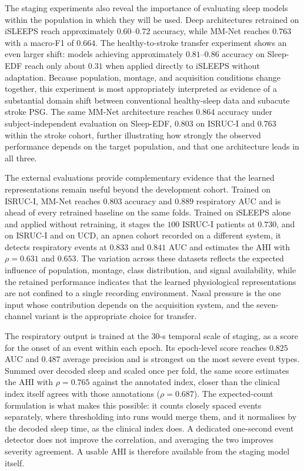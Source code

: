 \documentclass{ieeeaccess}
\newcommand{\mmAcc}{0.763}
\newcommand{\mmMf}{0.664}
\newcommand{\mmAuc}{0.825}
\newcommand{\mmAp}{0.487}
\newcommand{\mmRho}{0.765}
\begin{document}
The staging experiments also reveal the importance of evaluating sleep models
within the population in which they will be used. Deep architectures retrained
on iSLEEPS reach approximately $0.60$--$0.72$ accuracy, while MM-Net reaches
$\mmAcc$ with a macro-F1 of $\mmMf$. The healthy-to-stroke transfer experiment
shows an even larger shift: models achieving approximately $0.81$--$0.86$
accuracy on Sleep-EDF reach only about $0.31$ when applied directly to iSLEEPS
without adaptation. Because population, montage, and acquisition conditions
change together, this experiment is most appropriately interpreted as evidence
of a substantial domain shift between conventional healthy-sleep data and
subacute stroke PSG. The same MM-Net architecture reaches $0.864$ accuracy under
subject-independent evaluation on Sleep-EDF, $0.803$ on ISRUC-I and $\mmAcc$ within the stroke
cohort, further illustrating how strongly the observed performance depends on the target
population, and that one architecture leads in all three.

The external evaluations provide complementary evidence that the learned
representations remain useful beyond the development cohort. Trained on ISRUC-I, MM-Net reaches
$0.803$ accuracy and $0.889$ respiratory AUC and is ahead of every retrained baseline on the same
folds. Trained on iSLEEPS alone and applied without retraining, it stages the $100$ ISRUC-I
patients at $0.730$, and on ISRUC-I and on UCD, an apnea cohort recorded on a different system,
it detects respiratory events at $0.833$ and $0.841$ AUC and estimates the AHI with $\rho=0.631$
and $0.653$. The variation across these datasets reflects the expected influence of population,
montage, class distribution, and signal availability, while the retained performance indicates
that the learned physiological representations are not confined to a single recording
environment. Nasal pressure is the one input whose contribution depends on the acquisition
system, and the seven-channel variant is the appropriate choice for transfer.

The respiratory output is trained at the 30-s temporal scale of staging, as a score for the
onset of an event within each epoch. Its epoch-level score reaches $\mmAuc$ AUC and $\mmAp$
average precision and is strongest on the most severe event types. Summed over decoded sleep and
scaled once per fold, the same score estimates the AHI with $\rho=\mmRho$ against the annotated
index, closer than the clinical index itself agrees with those annotations ($\rho=0.687$). The
expected-count formulation is what makes this possible: it counts closely spaced events
separately, where thresholding into runs would merge them, and it normalises by the decoded
sleep time, as the clinical index does. A dedicated one-second event detector does not
improve the correlation, and averaging the two improves severity agreement. A usable AHI is
therefore available from the staging model itself.
\end{document}
